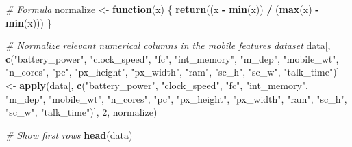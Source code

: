 \documentclass[
]{article}
\newenvironment{Shaded}{\begin{snugshade}}{\end{snugshade}}
\newcommand{\CommentTok}[1]{\textcolor[rgb]{0.56,0.35,0.01}{\textit{#1}}}
\newcommand{\ControlFlowTok}[1]{\textcolor[rgb]{0.13,0.29,0.53}{\textbf{#1}}}
\newcommand{\DecValTok}[1]{\textcolor[rgb]{0.00,0.00,0.81}{#1}}
\newcommand{\FunctionTok}[1]{\textcolor[rgb]{0.13,0.29,0.53}{\textbf{#1}}}
\newcommand{\NormalTok}[1]{#1}
\newcommand{\OtherTok}[1]{\textcolor[rgb]{0.56,0.35,0.01}{#1}}
\newcommand{\SpecialCharTok}[1]{\textcolor[rgb]{0.81,0.36,0.00}{\textbf{#1}}}
\newcommand{\StringTok}[1]{\textcolor[rgb]{0.31,0.60,0.02}{#1}}
\begin{document}
\begin{Shaded}
\begin{Highlighting}[]
\CommentTok{\# Formula}
\NormalTok{normalize }\OtherTok{\textless{}{-}} \ControlFlowTok{function}\NormalTok{(x) \{}
  \FunctionTok{return}\NormalTok{((x }\SpecialCharTok{{-}} \FunctionTok{min}\NormalTok{(x)) }\SpecialCharTok{/}\NormalTok{ (}\FunctionTok{max}\NormalTok{(x) }\SpecialCharTok{{-}} \FunctionTok{min}\NormalTok{(x)))}
\NormalTok{\}}

\CommentTok{\# Normalize relevant numerical columns in the mobile features dataset}
\NormalTok{data[, }\FunctionTok{c}\NormalTok{(}\StringTok{"battery\_power"}\NormalTok{, }\StringTok{"clock\_speed"}\NormalTok{, }\StringTok{"fc"}\NormalTok{, }\StringTok{"int\_memory"}\NormalTok{, }\StringTok{"m\_dep"}\NormalTok{, }
         \StringTok{"mobile\_wt"}\NormalTok{, }\StringTok{"n\_cores"}\NormalTok{, }\StringTok{"pc"}\NormalTok{, }\StringTok{"px\_height"}\NormalTok{, }\StringTok{"px\_width"}\NormalTok{, }
         \StringTok{"ram"}\NormalTok{, }\StringTok{"sc\_h"}\NormalTok{, }\StringTok{"sc\_w"}\NormalTok{, }\StringTok{"talk\_time"}\NormalTok{)] }\OtherTok{\textless{}{-}} 
  \FunctionTok{apply}\NormalTok{(data[, }\FunctionTok{c}\NormalTok{(}\StringTok{"battery\_power"}\NormalTok{, }\StringTok{"clock\_speed"}\NormalTok{, }\StringTok{"fc"}\NormalTok{, }\StringTok{"int\_memory"}\NormalTok{, }\StringTok{"m\_dep"}\NormalTok{, }
                 \StringTok{"mobile\_wt"}\NormalTok{, }\StringTok{"n\_cores"}\NormalTok{, }\StringTok{"pc"}\NormalTok{, }\StringTok{"px\_height"}\NormalTok{, }\StringTok{"px\_width"}\NormalTok{, }
                 \StringTok{"ram"}\NormalTok{, }\StringTok{"sc\_h"}\NormalTok{, }\StringTok{"sc\_w"}\NormalTok{, }\StringTok{"talk\_time"}\NormalTok{)], }\DecValTok{2}\NormalTok{, normalize)}

\CommentTok{\# Show first rows}
\FunctionTok{head}\NormalTok{(data)}
\end{Highlighting}
\end{Shaded}
\end{document}
